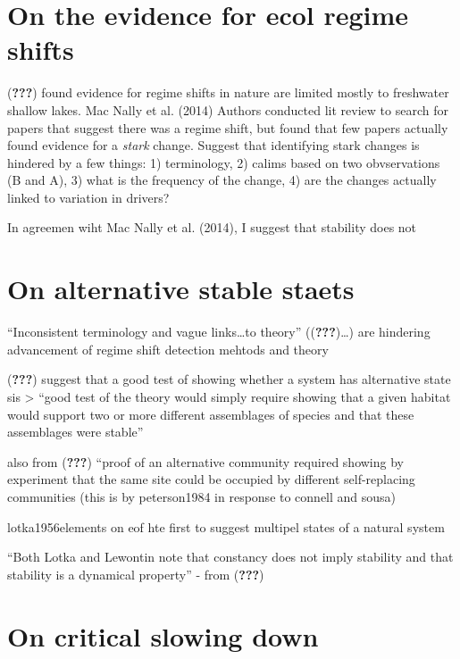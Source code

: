 \documentclass[12pt,twoside,openany]{reedthesis}
\begin{document}
\section{On the evidence for ecol regime
shifts}\label{on-the-evidence-for-ecol-regime-shifts}

({\textbf{???}}) found evidence for regime shifts in nature are limited
mostly to freshwater shallow lakes. Mac Nally et al. (2014) Authors
conducted lit review to search for papers that suggest there was a
regime shift, but found that few papers actually found evidence for a
\emph{stark} change. Suggest that identifying stark changes is hindered
by a few things: 1) terminology, 2) calims based on two obvservations (B
and A), 3) what is the frequency of the change, 4) are the changes
actually linked to variation in drivers?

In agreemen wiht Mac Nally et al. (2014), I suggest that stability does
not

\section{On alternative stable
staets}\label{on-alternative-stable-staets}

``Inconsistent terminology and vague links\ldots{}to theory''
(({\textbf{???}})\ldots{}) are hindering advancement of regime shift
detection mehtods and theory

({\textbf{???}}) suggest that a good test of showing whether a system
has alternative state sis \textgreater{} ``good test of the theory would
simply require showing that a given habitat would support two or more
different assemblages of species and that these assemblages were
stable''

also from ({\textbf{???}}) ``proof of an alternative community required
showing by experiment that the same site could be occupied by different
self-replacing communities (this is by peterson1984 in response to
connell and sousa)

lotka1956elements on eof hte first to suggest multipel states of a
natural system

``Both Lotka and Lewontin note that constancy does not imply stability
and that stability is a dynamical property'' - from ({\textbf{???}})

\section{On critical slowing down}\label{on-critical-slowing-down}
\end{document}
